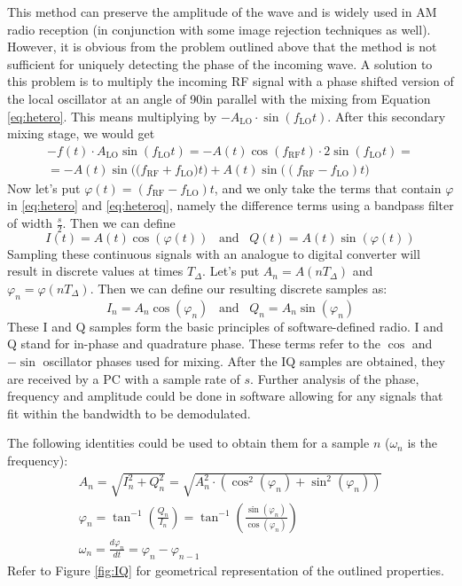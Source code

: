 \documentclass[a4paper,12pt,twoside,openright]{report}
\begin{document}
This method can preserve the amplitude of the wave and is widely used in AM radio reception (in conjunction with some image rejection techniques as well). However, it is obvious from the problem outlined above that the method is not sufficient for uniquely detecting the phase of the incoming wave. A solution to this problem is to multiply the incoming RF signal with a phase shifted version of the local oscillator at an angle of 90\degree in parallel with the mixing from Equation \ref{eq:hetero}. This means multiplying by $-A_\text{LO} \cdot \sin(f_\text{LO} t)$. After this secondary mixing stage, we would get
\begin{multline}
\label{eq:heteroq}
- f(t) \cdot A_\text{LO} \sin(f_\text{LO} t) =  -A(t) \cos(f_\text{RF} t) \cdot 2 \sin(f_\text{LO} t) = \\
=  - A(t) \sin\big( (f_\text{RF} + f_\text{LO} \big) t\big) + A(t) \sin\big( (f_\text{RF} - f_\text{LO}) t \big)
\end{multline}
Now let's put $\varphi(t) = (f_\text{RF}-f_\text{LO}) t$, and we only take the terms that contain $\varphi$ in \ref{eq:hetero} and \ref{eq:heteroq}, namely the difference terms using a bandpass filter of width $\frac{s}{2}$. Then we can define
\begin{equation}
I(t) = A(t) \cos( \varphi (t)) \,\,\,\,\, \text{and} \,\,\,\,\, Q(t) = A(t) \sin( \varphi (t))
\end{equation}
Sampling these continuous signals with an analogue to digital converter will result in discrete values at times $T_{\Delta}$. Let's put $A_{n} = A(n T_{\Delta})$ and $\varphi_{n} = \varphi(n T_{\Delta})$. Then we can define our resulting discrete samples as:
\begin{equation}
I_{n} = A_{n} \cos( \varphi_{n} ) \,\,\,\,\, \text{and} \,\,\,\,\, Q_{n} = A_{n} \sin( \varphi _{n})
\end{equation}
These I and Q samples form the basic principles of software-defined radio. I and Q stand for in-phase and quadrature phase\cite{kirkhorn1999introduction}. These terms refer to the $\cos$ and $-\sin$ oscillator phases used for mixing. After the IQ samples are obtained, they are received by a PC with a sample rate of $s$. Further analysis of the phase, frequency and amplitude could be done in software allowing for any signals that fit within the bandwidth to be demodulated.

The following identities could be used to obtain them for a sample $n$ ($\omega_{n}$ is the frequency):
\begin{subequations}
\begin{align}
A_{n} = \sqrt{I_n^2+Q_n^2} = \sqrt{A_{n}^2 \cdot (\cos^2(\varphi_n) + \sin^2(\varphi_n))} \\
\varphi_{n} = \tan^{-1}\left(\frac{Q_{n}}{I_{n}}\right) = \tan^{-1}\left(\frac{\sin(\varphi_{n})}{\cos(\varphi_{n})}\right) \\
\omega_{n} = \frac{d \varphi_{n}}{dt} = \varphi_{n} - \varphi_{n-1}
\end{align}
\end{subequations}
Refer to Figure \ref{fig:IQ} for geometrical representation of the outlined properties.
\end{document}
